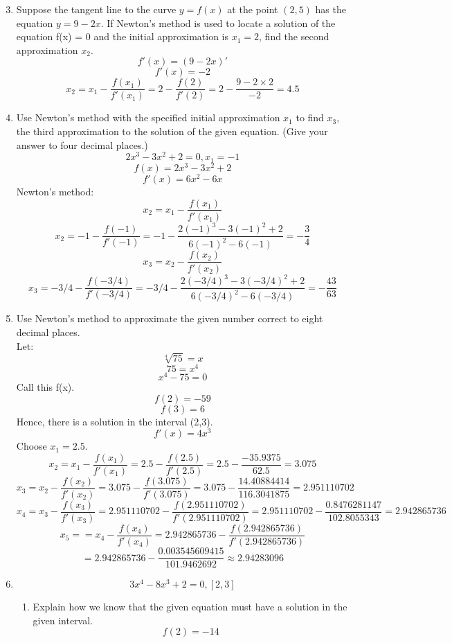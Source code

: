 \documentclass[12pt]{article}
\begin{document}
\begin{enumerate}
    \setcounter{enumi}{2}
    \item Suppose the tangent line to the curve $y = f(x)$ at the point $(2,5)$ has the equation $y = 9-2x$. If Newton’s method is used to locate a solution of the equation f(x) = 0 and the initial approximation is $x_1 = 2$, find the second approximation $x_2$.
    \[f'(x) = (9-2x)'\]
    \[f'(x) = -2\]
    \[x_2 = x_1 - \frac{f(x_1)}{f'(x_1)} = 2 - \frac{f(2)}{f'(2)} = 2 - \frac{9 - 2\times 2}{-2} = 4.5\]
    \setcounter{enumi}{5}
    \item Use Newton’s method with the specified initial approximation $x_1$ to find $x_3$, the third approximation to the solution of the given equation. (Give your answer to four decimal places.)
    \[2x^3 - 3x^2 + 2 = 0, x_1 = -1\]
    \[f(x) = 2x^3 - 3x^2 + 2 \]
    \[f'(x) = 6x^2 - 6x\]
    Newton's method:
    \[x_2 = x_1 - \frac{f(x_1)}{f'(x_1)}\]
    \[x_2 = -1 - \frac{f(-1)}{f'(-1)} = -1 - \frac{2(-1)^3 - 3(-1)^2 + 2}{6(-1)^2 - 6(-1)} = -\frac{3}{4}\]
    \[x_3 = x_2 - \frac{f(x_2)}{f'(x_2)}\]
    \[x_3 = -3/4 - \frac{f(-3/4)}{f'(-3/4)} = -3/4 - \frac{2(-3/4)^3 - 3(-3/4)^2 + 2}{6(-3/4)^2 - 6(-3/4)} = -\frac{43}{63}\]
    \setcounter{enumi}{10}
    \item Use Newton’s method to approximate the given number correct to eight decimal places.\\
    Let:
    \[\sqrt[4]{75} = x\]
    \[75 = x^4\]
    \[x^4 - 75 = 0\]
    Call this f(x).
    \[f(2) = -59\]
    \[f(3) = 6\]
    Hence, there is a solution in the interval (2,3).
    \[f'(x) = 4x^3\]
    Choose $x_1 = 2.5$.
    \[x_2 = x_1 - \frac{f(x_1)}{f'(x_1)} = 2.5 - \frac{f(2.5)}{f'(2.5)} = 2.5 - \frac{-35.9375}{62.5} = 3.075\]
    \[x_3 = x_2 - \frac{f(x_2)}{f'(x_2)} = 3.075 - \frac{f(3.075)}{f'(3.075)} = 3.075 - \frac{14.40884414}{116.3041875} = 2.951110702\]
    \[x_4 = x_3 - \frac{f(x_3)}{f'(x_3)} = 2.951110702 - \frac{f(2.951110702)}{f'(2.951110702)} = 2.951110702 - \frac{0.8476281147}{102.8055343} = 2.942865736\] 
    \[x_5 = = x_4 - \frac{f(x_4)}{f'(x_4)} = 2.942865736 - \frac{f(2.942865736)}{f'(2.942865736)}\] 
    \[ = 2.942865736 - \frac{0.003545609415}{101.9462692} \approx 2.94283096\]    
    \setcounter{enumi}{12}
    \item
    \[3x^4 - 8x^3 + 2 = 0, [2,3]\]
    \begin{enumerate}
        \item Explain how we know that the given equation must have a solution in the given interval.
        \[f(2) = -14\]

\end{enumerate}
\end{enumerate}
\end{document}
